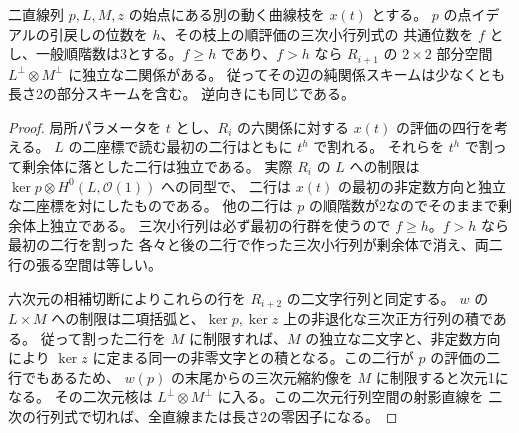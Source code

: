 \begin{proposition}\label{prop:excess-contact-two-line-pure}
二直線列 $p,L,M,z$ の始点にある別の動く曲線枝を $x(t)$ とする。
$p$ の点イデアルの引戻しの位数を $h$、その枝上の順評価の三次小行列式の
共通位数を $f$ とし、一般順階数は3とする。$f\ge h$ であり、$f>h$ なら
$R_{i+1}$ の $2\times 2$ 部分空間 $L^\perp\otimes M^\perp$ に独立な二関係がある。
従ってその辺の純関係スキームは少なくとも長さ2の部分スキームを含む。
逆向きにも同じである。
\end{proposition}
\begin{proof}
局所パラメータを $t$ とし、$R_i$ の六関係に対する $x(t)$ の評価の四行を考える。
$L$ の二座標で読む最初の二行はともに $t^h$ で割れる。
それらを $t^h$ で割って剰余体に落とした二行は独立である。
実際 $R_i$ の $L$ への制限は $\ker p\otimes H^0(L,\mathcal O(1))$ への同型で、
二行は $x(t)$ の最初の非定数方向と独立な二座標を対にしたものである。
他の二行は $p$ の順階数が2なのでそのままで剰余体上独立である。
三次小行列は必ず最初の行群を使うので $f\ge h$。$f>h$ なら最初の二行を割った
各々と後の二行で作った三次小行列が剰余体で消え、両二行の張る空間は等しい。

六次元の相補切断によりこれらの行を $R_{i+2}$ の二文字行列と同定する。
$w$ の $L\times M$ への制限は二項括弧と、$\ker p,\ker z$ 上の非退化な三次正方行列の積である。
従って割った二行を $M$ に制限すれば、$M$ の独立な二文字と、非定数方向により
$\ker z$ に定まる同一の非零文字との積となる。この二行が $p$ の評価の二行でもあるため、
$w(p)$ の末尾からの三次元縮約像を $M$ に制限すると次元1になる。
その二次元核は $L^\perp\otimes M^\perp$ に入る。この二次元行列空間の射影直線を
二次の行列式で切れば、全直線または長さ2の零因子になる。
\end{proof}
